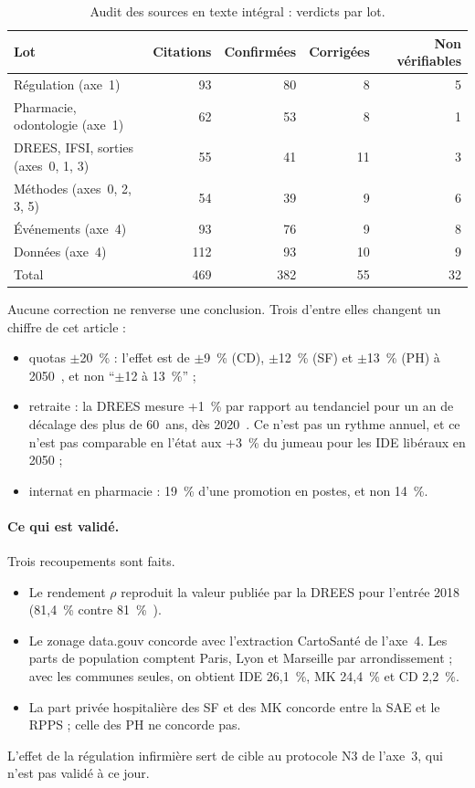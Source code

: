 \begin{table}[htbp]
\centering\small
\caption{Audit des sources en texte intégral : verdicts par lot.}\label{a1-tab:audit}
\begin{tabular}{lrrrr}
\toprule
Lot & Citations & Confirmées & Corrigées & Non vérifiables \\
\midrule
Régulation (axe~1) & 93 & 80 & 8 & 5 \\
Pharmacie, odontologie (axe~1) & 62 & 53 & 8 & 1 \\
DREES, IFSI, sorties (axes~0, 1, 3) & 55 & 41 & 11 & 3 \\
Méthodes (axes~0, 2, 3, 5) & 54 & 39 & 9 & 6 \\
Événements (axe~4) & 93 & 76 & 9 & 8 \\
Données (axe~4) & 112 & 93 & 10 & 9 \\
\midrule
Total & 469 & 382 & 55 & 32 \\
\bottomrule
\end{tabular}
\end{table}

Aucune correction ne renverse une conclusion. Trois d'entre elles changent
un chiffre de cet article :
\begin{itemize}
\item quotas $\pm$20~\% : l'effet est de $\pm$9~\% (CD), $\pm$12~\%
  (SF) et $\pm$13~\% (PH) à 2050~\cite{a1-dd76}, et non \enquote{$\pm$12 à
  13~\%} ;
\item retraite : la DREES mesure +1~\% par rapport au tendanciel pour un an
  de décalage des plus de 60~ans, dès 2020~\cite{a1-er1062,a1-er1075}. Ce n'est
  pas un rythme annuel, et ce n'est pas comparable en l'état aux +3~\% du
  jumeau pour les IDE libéraux en 2050 ;
\item internat en pharmacie : 19~\% d'une promotion en postes, et non
  14~\%.
\end{itemize}

\paragraph{Ce qui est validé.}
Trois recoupements sont faits.
\begin{itemize}
\item Le rendement $\rho$ reproduit la valeur publiée par la DREES pour
  l'entrée 2018 (81,4~\%\mesure{} contre 81~\%~\cite{a1-er1266}).
\item Le zonage data.gouv concorde avec l'extraction CartoSanté de l'axe~4.
  Les parts de population comptent Paris, Lyon et Marseille par
  arrondissement ; avec les communes seules, on obtient IDE 26,1~\%,
  MK 24,4~\% et CD 2,2~\%\derive.
\item La part privée hospitalière des SF et des MK concorde entre la SAE et
  le RPPS ; celle des PH ne concorde pas.
\end{itemize}
L'effet de la régulation infirmière sert de cible au protocole N3 de
l'axe~3, qui n'est pas validé à ce jour.

